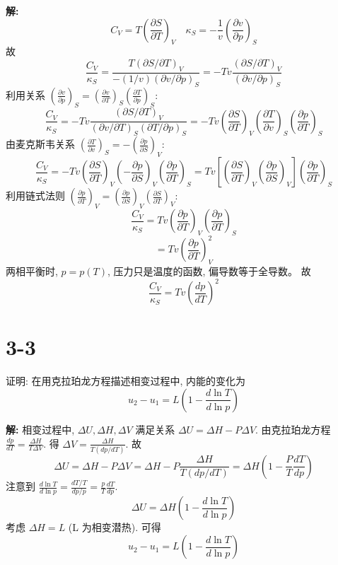 \documentclass{article}
\begin{document}
\textbf{解:}
\[ C_V = T \left( \frac{\partial S}{\partial T} \right)_V \quad \kappa_S = -\frac{1}{v} \left( \frac{\partial v}{\partial p} \right)_S \]
故
\[ \frac{C_V}{\kappa_S} = \frac{T (\partial S / \partial T)_V}{- (1/v) (\partial v / \partial p)_S} = - T v \frac{(\partial S / \partial T)_V}{(\partial v / \partial p)_S} \]
利用关系 $\left( \frac{\partial v}{\partial p} \right)_S = \left( \frac{\partial v}{\partial T} \right)_S \left( \frac{\partial T}{\partial p} \right)_S$:
\[ \frac{C_V}{\kappa_S} = - T v \frac{(\partial S / \partial T)_V}{(\partial v / \partial T)_S (\partial T / \partial p)_S} = - T v \left( \frac{\partial S}{\partial T} \right)_V \left( \frac{\partial T}{\partial v} \right)_S \left( \frac{\partial p}{\partial T} \right)_S \]
由麦克斯韦关系 $\left( \frac{\partial T}{\partial v} \right)_S = - \left( \frac{\partial p}{\partial S} \right)_V$:
\[ \frac{C_V}{\kappa_S} = - T v \left( \frac{\partial S}{\partial T} \right)_V \left( - \frac{\partial p}{\partial S} \right)_V \left( \frac{\partial p}{\partial T} \right)_S = T v \left[ \left( \frac{\partial S}{\partial T} \right)_V \left( \frac{\partial p}{\partial S} \right)_V \right] \left( \frac{\partial p}{\partial T} \right)_S \]
利用链式法则 $\left( \frac{\partial p}{\partial T} \right)_V = \left( \frac{\partial p}{\partial S} \right)_V \left( \frac{\partial S}{\partial T} \right)_V$:
\[ \frac{C_V}{\kappa_S} = T v \left( \frac{\partial p}{\partial T} \right)_V \left( \frac{\partial p}{\partial T} \right)_S \]
\[ = T v \left( \frac{\partial p}{\partial T} \right)_V^2 \]
两相平衡时, $p=p(T)$, 压力只是温度的函数, 偏导数等于全导数。
故
\[ \frac{C_V}{\kappa_S} = T v \left( \frac{dp}{dT} \right)^2 \]


\hrulefill

\section*{3-3}
证明: 在用克拉珀龙方程描述相变过程中, 内能的变化为
\[ u_2 - u_1 = L \left( 1 - \frac{d \ln T}{d \ln p} \right) \]

\textbf{解:} 相变过程中, $\Delta U, \Delta H, \Delta V$ 满足关系 $\Delta U = \Delta H - P \Delta V$.
由克拉珀龙方程 $\frac{dp}{dT} = \frac{\Delta H}{T \Delta V}$.
得 $\Delta V = \frac{\Delta H}{T (dp/dT)}$.
故
\[ \Delta U = \Delta H - P \Delta V = \Delta H - P \frac{\Delta H}{T (dp/dT)} = \Delta H \left( 1 - \frac{P}{T} \frac{dT}{dp} \right) \]
注意到 $\frac{d \ln T}{d \ln p} = \frac{dT/T}{dp/p} = \frac{p}{T} \frac{dT}{dp}$.
\[ \Delta U = \Delta H \left( 1 - \frac{d \ln T}{d \ln p} \right) \]
考虑 $\Delta H = L$ (L 为相变潜热).
可得
\[ u_2 - u_1 = L \left( 1 - \frac{d \ln T}{d \ln p} \right) \]
\end{document}
